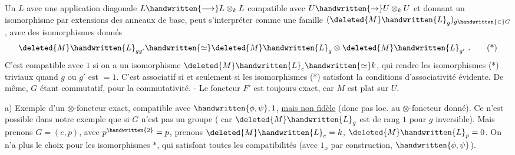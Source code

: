 Un $L$ avec une application diagonale $L\handwritten{\longrightarrow}L\otimes_k L$ compatible avec $U\handwritten{\to}U\otimes_k U$ et donnant un isomorphisme par extensions des anneaux de base, peut s'interpréter comme une famille $(\deleted{M}\handwritten{L}_g)_{g\handwritten{\in}G}$, avec des isomorphismes donnés
\[
\deleted{M}\handwritten{L}_{gg'}\handwritten{\simeq}\deleted{M}\handwritten{L}_g\otimes\deleted{M}\handwritten{L}_{g'}\ .
\tag*{(*)}
\]
C'est compatible avec $1$ si on a un isomorphisme\inserted{\handwritten{\unsure{(**)|(*+)}}} $\deleted{M}\handwritten{L}_e\handwritten{\simeq}k$, qui rendre les isomorphismes (*) triviaux quand  $g$ ou $g'$ est $=1$. C'est associatif si et seulement si les isomorphismes (*) satisfont la  conditions d'associativité évidente. De même, $G$ étant commutatif, pour la commutativité. - Le foncteur $F'$ est toujours exact, car $M$ est plat sur $U$.

a) Exemple d'un $\otimes$-foncteur exact, compatible avec $\handwritten{\phi,\psi},1$, \uline{mais non fidèle} (donc pas loc.  au $\otimes$-foncteur donné). Ce n'est possible dans notre exemple que si $G$ n'est pas un groupe ( car $\deleted{M}\handwritten{L}_g$ est de rang $1$ pour $g$ inversible). Mais prenons $G=(e,p)$, avec $p^{\handwritten{2}}=p$, prenons $\deleted{M}\handwritten{L}_e=k$, $\deleted{M}\handwritten{L}_p=0$. On n'a plus le choix pour les isomorphismes $*$, qui satisfont toutes les compatibilités (avec $1_x$ par construction, $\handwritten{\phi,\psi}$).
